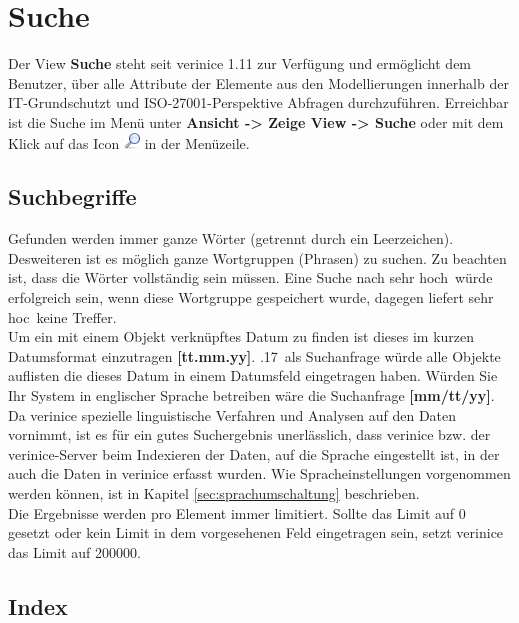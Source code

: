\documentclass[a4paper,10pt]{book}
\begin{document}
\section{Suche}
\label{sec:suche}

Der View \textbf{Suche} steht seit verinice 1.11 zur Verfügung und
ermöglicht dem Benutzer, über alle Attribute der Elemente aus den
Modellierungen innerhalb der IT-Grundschutzt und ISO-27001-Perspektive
Abfragen durchzuführen. Erreichbar ist die Suche im Menü unter
\textbf{Ansicht -> Zeige View -> Suche} oder mit dem Klick auf das
Icon \includegraphics[height=2ex]{Icon/search.png} in der Menüzeile.

\subsection{Suchbegriffe}
\label{sec:suchbegriffe}

Gefunden werden immer ganze Wörter (getrennt durch ein
Leerzeichen). Desweiteren ist es möglich ganze Wortgruppen (Phrasen)
zu suchen. Zu beachten ist, dass die Wörter vollständig sein
müssen. Eine Suche nach \glqq sehr hoch\grqq\ würde erfolgreich sein,
wenn diese Wortgruppe gespeichert wurde, dagegen liefert \glqq sehr
hoc\grqq\ keine Treffer.\\

Um ein mit einem Objekt verknüpftes Datum zu finden ist dieses im kurzen 
Datumsformat einzutragen \textbf{[tt.mm.yy]}.
.17\grqq\ als Suchanfrage  würde alle Objekte auflisten die dieses
Datum in einem Datumsfeld eingetragen haben. Würden Sie Ihr System 
in englischer Sprache betreiben wäre die Suchanfrage \textbf{[mm/tt/yy]}.\\

Da verinice spezielle linguistische Verfahren und Analysen auf den
Daten vornimmt, ist es für ein gutes Suchergebnis unerlässlich, dass
verinice bzw. der verinice-Server beim Indexieren der Daten, auf die
Sprache eingestellt ist, in der auch die Daten in verinice erfasst
wurden. Wie Spracheinstellungen vorgenommen werden können, ist in
Kapitel \ref{sec:sprachumschaltung} beschrieben.\\

Die Ergebnisse werden pro Element immer limitiert. Sollte das Limit
auf 0 gesetzt oder kein Limit in dem vorgesehenen Feld eingetragen
sein, setzt verinice das Limit auf 200000.

\subsection{Index}
\label{sec:index}
\end{document}
